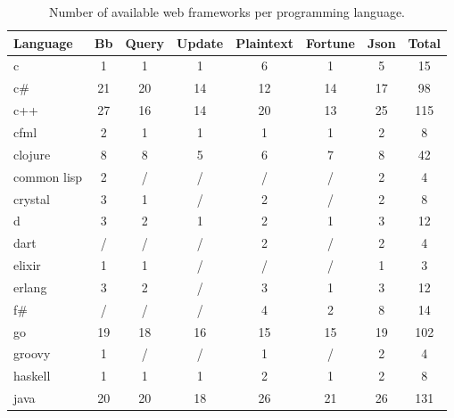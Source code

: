 \begin{table*}
    \caption{Number of available web frameworks per programming language.}
    \label{table:frameworks_count}
    \small
    \center
    \begin{tabular}{l|c|c|c|c|c|c|c}
        \toprule
        Language    & Bb      & Query   & Update  & Plaintext & Fortune & Json    & Total     \\
        \midrule
        c           & 1       & 1       & 1       & 6         & 1       & 5       & 15        \\
        c\#         & 21      & 20      & 14      & 12        & 14      & 17      & 98        \\
        c++         & 27      & 16      & 14      & 20        & 13      & 25      & 115       \\
        cfml        & 2       & 1       & 1       & 1         & 1       & 2       & 8         \\
        clojure     & 8       & 8       & 5       & 6         & 7       & 8       & 42        \\
        common lisp & 2       & /       & /       & /         & /       & 2       & 4         \\
        crystal     & 3       & 1       & /       & 2         & /       & 2       & 8         \\
        d           & 3       & 2       & 1       & 2         & 1       & 3       & 12        \\
        dart        & /       & /       & /       & 2         & /       & 2       & 4         \\
        elixir      & 1       & 1       & /       & /         & /       & 1       & 3         \\
        erlang      & 3       & 2       & /       & 3         & 1       & 3       & 12        \\
        f\#         & /       & /       & /       & 4         & 2       & 8       & 14        \\
        go          & 19      & 18      & 16      & 15        & 15      & 19      & 102       \\
        groovy      & 1       & /       & /       & 1         & /       & 2       & 4         \\
        haskell     & 1       & 1       & 1       & 2         & 1       & 2       & 8         \\
        java        & 20      & 20      & 18      & 26        & 21      & 26      & 131       \\

\end{tabular}
\end{table*}
